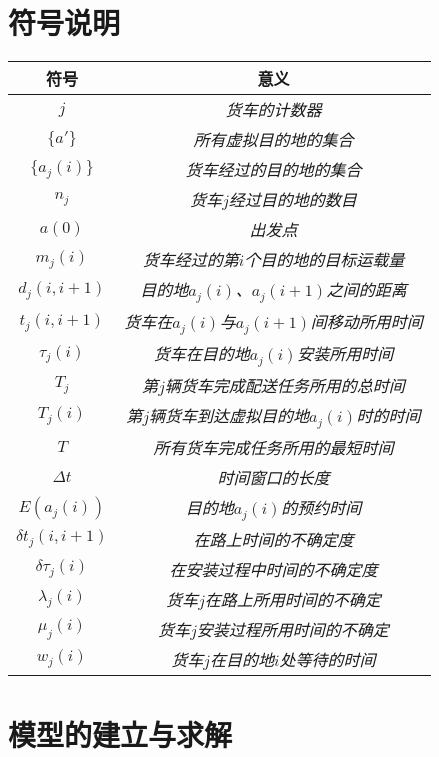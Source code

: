 \documentclass[UTF8,cs4size]{ctexart}
\begin{document}
\section{符号说明}
\begin{table}[!h]
\centering
\begin{tabular}{cc}
\toprule
\textbf{符号} & \textbf{意义} \\  
\midrule
$j$ & \emph{货车的计数器} \\
$\{a' \}$ & \emph{所有虚拟目的地的集合} \\
$\{a_j(i) \}$ & \emph{货车经过的目的地的集合} \\
$n_j$ & \emph{货车$j$经过目的地的数目} \\
$a(0)$ & \emph{出发点} \\
$m_j(i)$ & \emph{货车经过的第$i$个目的地的目标运载量} \\
$d_j(i, i+1)$ & \emph{目的地$a_j(i)$、$a_{j}(i+1)$之间的距离} \\
$t_{j}(i , i+1)$ & \emph{货车在$a_j(i)$与$a_j(i+1)$间移动所用时间} \\
$\tau _{j} (i)$ & \emph{货车在目的地$a_j(i)$安装所用时间} \\
$T_j$ & \emph{第$j$辆货车完成配送任务所用的总时间} \\
$T_j(i)$ & \emph{第$j$辆货车到达虚拟目的地$a_j(i)$时的时间} \\
$T$ & \emph{所有货车完成任务所用的最短时间} \\
$\Delta t$ & \emph{时间窗口的长度} \\
$E(a_j(i))$ & \emph{目的地$a_j(i)$的预约时间} \\
$\delta t_{j}(i, i + 1)$ & \emph{在路上时间的不确定度} \\
$\delta \tau _ {j} (i)$ & \emph{在安装过程中时间的不确定度} \\
$\lambda _j(i)$ & \emph{货车$j$在路上所用时间的不确定} \\
$\mu _j(i)$ & \emph{货车$j$安装过程所用时间的不确定} \\
$w_j(i)$ & \emph{货车$j$在目的地$i$处等待的时间} \\
\bottomrule
\end{tabular}
\end{table}
\section{模型的建立与求解}
\end{document}
